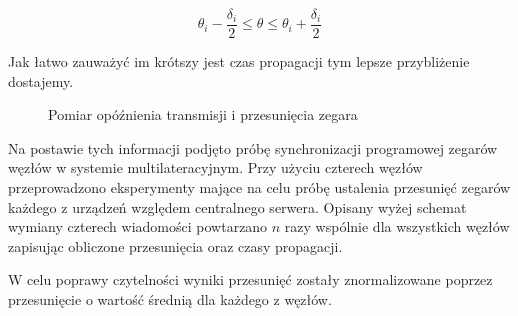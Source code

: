 \[\theta_i - \frac{\delta_i}{2} \leqslant \theta \leqslant \theta_i + \frac{\delta_i}{2}\]

Jak łatwo zauważyć im krótszy jest czas propagacji tym lepsze przybliżenie dostajemy.

\begin{figure}[h]
\centering
{}%
\caption{Pomiar opóźnienia transmisji i przesunięcia zegara}
\label{fig:ntp}
\end{figure}

Na postawie tych informacji podjęto próbę synchronizacji programowej zegarów węzłów w systemie multilateracyjnym. Przy użyciu czterech węzłów przeprowadzono eksperymenty mające na celu próbę ustalenia przesunięć zegarów każdego z urządzeń względem centralnego serwera. Opisany wyżej schemat wymiany czterech wiadomości powtarzano $n$ razy wspólnie dla wszystkich węzłów zapisując obliczone przesunięcia oraz czasy propagacji.

W celu poprawy czytelności wyniki przesunięć zostały znormalizowane poprzez przesunięcie o wartość średnią dla każdego z węzłów.


